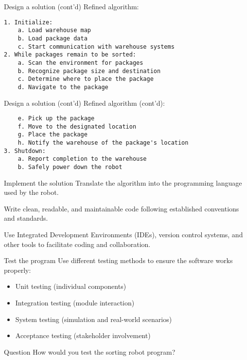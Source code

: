 \documentclass[sectionframe]{oxblue-beamer}
\begin{document}
\begin{frame}[fragile]{Design a solution (cont'd)}
Refined algorithm:

\begin{verbatim}
1. Initialize:
    a. Load warehouse map
    b. Load package data
    c. Start communication with warehouse systems
2. While packages remain to be sorted:
    a. Scan the environment for packages
    b. Recognize package size and destination
    c. Determine where to place the package
    d. Navigate to the package
\end{verbatim}
\end{frame}

\begin{frame}[fragile]{Design a solution (cont'd)}
Refined algorithm (cont'd):

\begin{verbatim}
    e. Pick up the package
    f. Move to the designated location
    g. Place the package
    h. Notify the warehouse of the package's location
3. Shutdown:
    a. Report completion to the warehouse
    b. Safely power down the robot
\end{verbatim}
\end{frame}

\begin{frame}{Implement the solution}
Translate the algorithm into the programming language used by the robot.

\bigskip Write clean, readable, and maintainable code following established conventions and standards.

\bigskip Use Integrated Development Environments (IDEs), version control systems, and other tools to facilitate coding and collaboration.
\end{frame}

\begin{frame}{Test the program}
Use different testing methods to ensure the software works properly:

\begin{itemize}
    \item Unit testing (individual components)
    \item Integration testing (module interaction)
    \item System testing (simulation and real-world scenarios)
    \item Acceptance testing (stakeholder involvement)
\end{itemize}

\bigskip \begin{block}{Question}
    How would you test the sorting robot program?
\end{block}
\end{frame}
\end{document}
